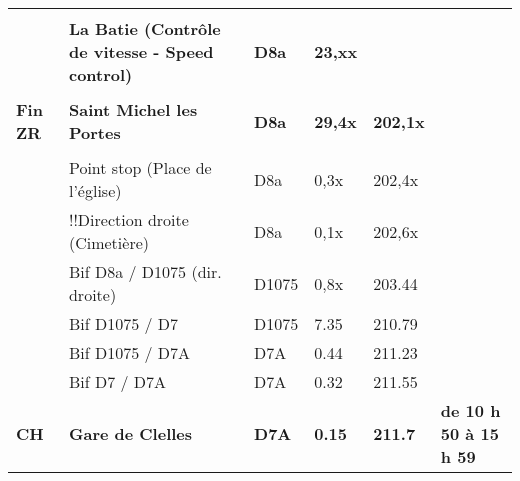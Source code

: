 \documentclass{article}%
\begin{document}
\begin{longtable}{p{2.25cm}|p{7.0cm}|p{1.5cm}|p{1.5cm}|p{1.5cm}|p{3.5cm}}
 & & & & & \\%
 &\textbf{La Batie (Contrôle de vitesse - Speed control)}&\textbf{D8a}&\textbf{23,xx}& & \\%
 & & & & & \\%
\textbf{Fin ZR}&\textbf{Saint Michel les Portes}&\textbf{D8a}&\textbf{29,4x}&\textbf{202,1x}& \\%
 & & & & & \\%
 &Point stop (Place de l'église)&D8a&0,3x&202,4x& \\%
 &!!Direction droite (Cimetière) &D8a&0,1x&202,6x& \\%
 &Bif D8a / D1075 (dir. droite)&D1075&0,8x&203.44& \\%
 &Bif D1075 / D7 &D1075&7.35&210.79& \\%
 &Bif D1075 / D7A&D7A&0.44&211.23& \\%
 &Bif D7 / D7A&D7A&0.32&211.55& \\%
\textbf{CH}&\textbf{Gare de  Clelles}&\textbf{D7A}&\textbf{0.15}&\textbf{211.7}&\textbf{de 10 h 50 à 15 h 59}\\%
\hline%
\end{longtable}%
\end{document}
